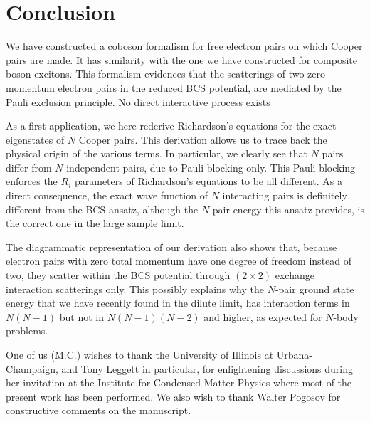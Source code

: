 \documentclass[epj]{svjour}
\begin{document}
\section{Conclusion}

We have constructed a coboson formalism for free electron pairs on which Cooper pairs are made. It has similarity with the one we have constructed for composite boson excitons. This formalism evidences that the scatterings of two zero-momentum electron pairs in the reduced BCS potential, are mediated by the Pauli exclusion principle. No direct interactive process exists


As a first application, we here rederive Richardson's equations for the exact eigenstates of $N$ Cooper pairs. This 
  derivation allows us to trace back
the physical origin of the various terms. In
particular, we clearly see that $N$ pairs differ from $N$ independent
pairs, due to Pauli blocking only. This Pauli blocking
enforces the $R_i$ parameters of Richardson's equations to be all different. 
As a direct consequence, the exact wave function of $N$ interacting pairs is 
definitely different from the BCS ansatz, although the $N$-pair energy this ansatz provides, is the correct one in the large sample limit. 

The diagrammatic
representation of our derivation also shows that, because electron pairs
with zero total momentum have one degree of freedom instead of two, they scatter within the BCS potential through 
$(2\times2)$ exchange interaction scatterings only. This possibly explains
why the $N$-pair ground state energy that we have recently found in the dilute limit, has interaction terms in $N(N-1)$ but not in $N(N-1)(N-2)
$ and higher, as expected for $N$-body problems.

One of us (M.C.) wishes to thank the University of Illinois at
Urbana-Champaign, and Tony Leggett in particular, for enlightening discussions during her invitation at
the Institute for Condensed Matter Physics where most of the present work has been
performed. We also wish to thank Walter Pogosov for  constructive comments on the manuscript.




\end{document}
